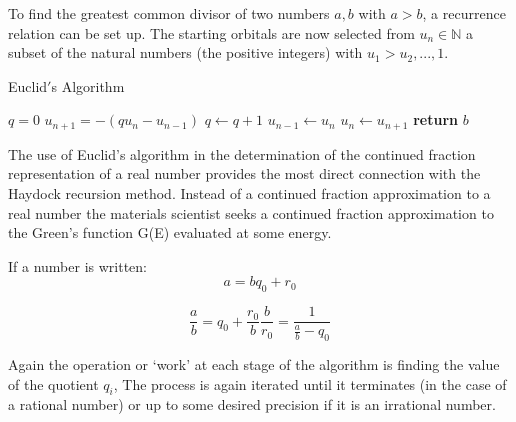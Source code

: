 To find the greatest common divisor of two numbers $a,b$ with
$a>b$, a recurrence relation can be set up. The starting orbitals are now 
selected from ${u_{n}}\in\mathbb{N}$ a subset of the 
natural numbers (the positive integers) with ${u_1>u_2,...,1}$.

\begin{algorithm}
\caption{Euclid$'$s Algorithm}\label{alg:euclid}
\begin{algorithmic}[1]
\State $q = 0$
\State $u_{n+1} = -(qu_{n} - u_{n-1})$
\State $q \gets q+1$
\EndWhile\label{quotientwhile}
\State $u_{n-1} \gets u_{n}$
\State $u_{n} \gets u_{n+1}$
\EndWhile\label{euclidendwhile}
\State \textbf{return} $b$
\EndProcedure
\end{algorithmic}
\end{algorithm}

The use of Euclid's algorithm in the determination of 
the continued fraction representation of a real number
provides the most direct connection with the Haydock recursion
method. Instead of a continued fraction approximation to a real
number the materials scientist seeks a continued fraction
approximation to the Green's function G(E) evaluated 
at some energy.

If a number is written:
\begin{equation}
a=bq_{0} + r_{0}
\end{equation}

\begin{equation}
\frac{a}{b} = q_{0} + \frac{r_{0}}{b}
\frac{b}{r_{0}} = \frac{1}{\frac{a}{b} - q_{0}}
\end{equation}

Again the operation or `work' at each stage of the algorithm
is finding the value of the quotient $q_i$, The process
is again iterated until it terminates (in the case of a rational number)
or up to some desired precision if it is an irrational number.


